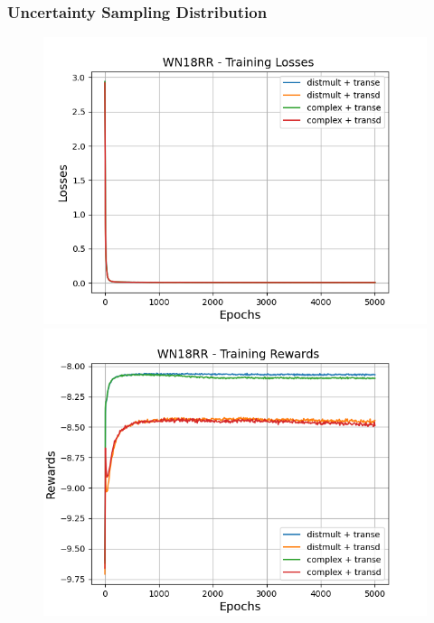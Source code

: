 \subsubsection{Uncertainty Sampling Distribution}

\begin{figure}
    \centering
    \begin{minipage}{.5\textwidth}
      \centering
      \includegraphics[width=0.9\linewidth]{figures/results/gan_train/not_pretrained/uncertainty/max_distribution/entropy/wn18rr/gan_train_uncertainty_wn18rr_losses.png}
    \end{minipage}%
    \begin{minipage}{.5\textwidth}
      \centering
      \includegraphics[width=0.9\linewidth]{figures/results/gan_train/not_pretrained/uncertainty/max_distribution/entropy/wn18rr/gan_train_uncertainty_wn18rr_rewards.png}

\end{minipage}
\end{figure}
